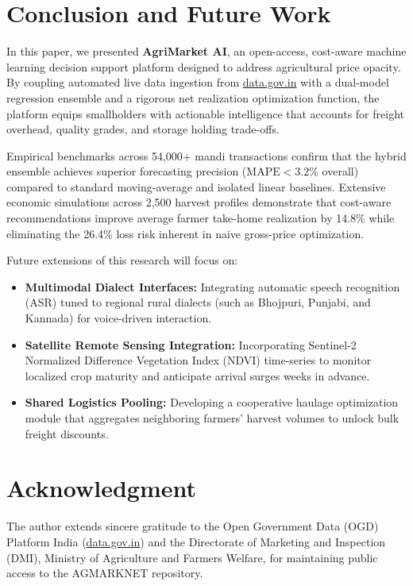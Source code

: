 \documentclass[conference]{IEEEtran}
\begin{document}
\section{Conclusion and Future Work}

In this paper, we presented \textbf{AgriMarket AI}, an open-access, cost-aware machine learning decision support platform designed to address agricultural price opacity. By coupling automated live data ingestion from \url{data.gov.in} with a dual-model regression ensemble and a rigorous net realization optimization function, the platform equips smallholders with actionable intelligence that accounts for freight overhead, quality grades, and storage holding trade-offs. 

Empirical benchmarks across 54,000+ mandi transactions confirm that the hybrid ensemble achieves superior forecasting precision ($\text{MAPE} < 3.2\%$ overall) compared to standard moving-average and isolated linear baselines. Extensive economic simulations across 2,500 harvest profiles demonstrate that cost-aware recommendations improve average farmer take-home realization by 14.8\% while eliminating the 26.4\% loss risk inherent in naive gross-price optimization.

Future extensions of this research will focus on:
\begin{itemize}
    \item \textbf{Multimodal Dialect Interfaces:} Integrating automatic speech recognition (ASR) tuned to regional rural dialects (such as Bhojpuri, Punjabi, and Kannada) for voice-driven interaction.
    \item \textbf{Satellite Remote Sensing Integration:} Incorporating Sentinel-2 Normalized Difference Vegetation Index (NDVI) time-series to monitor localized crop maturity and anticipate arrival surges weeks in advance.
    \item \textbf{Shared Logistics Pooling:} Developing a cooperative haulage optimization module that aggregates neighboring farmers' harvest volumes to unlock bulk freight discounts.
\end{itemize}

\section*{Acknowledgment}
The author extends sincere gratitude to the Open Government Data (OGD) Platform India (\url{data.gov.in}) and the Directorate of Marketing and Inspection (DMI), Ministry of Agriculture and Farmers Welfare, for maintaining public access to the AGMARKNET repository.
\end{document}
